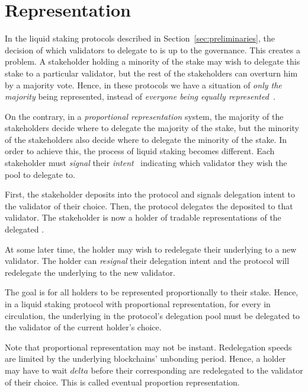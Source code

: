\section{Representation}

In the liquid staking protocols described in Section~\ref{sec:preliminaries},
the decision of which validators to delegate to is up to the governance.
This creates a problem. A stakeholder holding a minority of the stake
may wish to delegate this stake to a particular validator, but the rest
of the stakeholders can overturn him by a majority vote. Hence, in these
protocols we have a situation of \emph{only the majority} being represented,
instead of \emph{everyone being equally represented}~\cite{mill1862true}.

On the contrary, in a \emph{proportional representation} system, the
majority of the stakeholders decide where to delegate the majority of
the stake, but the minority of the stakeholders also decide where to delegate
the minority of the stake. In order to achieve this, the process of liquid
staking becomes different. Each stakeholder must \emph{signal} their
\emph{intent}~\cite{quicksilver} indicating which validator they wish
the pool to delegate to.

First, the stakeholder deposits \asset into the protocol and signals
delegation intent to the validator of their choice. Then, the protocol
delegates the deposited \asset to that validator. The stakeholder is
now a holder of tradable \stasset representations of the delegated \asset.

At some later time, the \stasset holder may wish to redelegate
their underlying \asset to a new validator.
The \stasset holder can \emph{resignal} their delegation intent and the protocol
will redelegate the underlying \asset to the new validator.

The goal is for all \stasset holders to be represented proportionally to
their stake. Hence, in a liquid staking protocol with proportional
representation, for every \stasset in circulation, the underlying \asset
in the protocol's delegation pool must be delegated to the validator
of the current \stasset holder's choice.

Note that proportional representation may not be instant. Redelegation speeds
are limited by the underlying blockchains' unbonding period.
Hence, a \stasset holder may have to wait $delta$ before their corresponding
\assets are redelegated to the validator of their choice. This is called
eventual proportion representation.